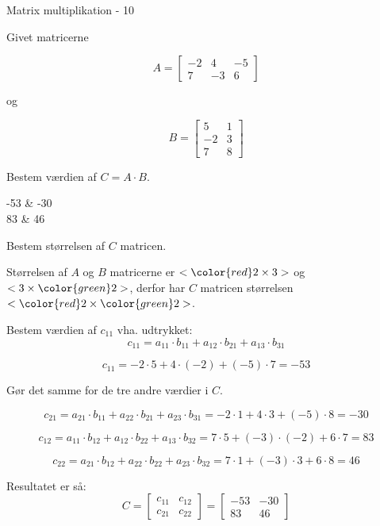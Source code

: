 \documentclass{article}
\begin{document}
\newpage

\begin{exercise}{Matrix multiplikation - 10}

Givet matricerne

\[
A = \left[\begin{array}{rrr}
-2 & 4 & -5 \\
7 & -3 & 6
\end{array} \right]
\]

og

\[
B = \left[\begin{array}{rr}
5 & 1 \\
-2 & 3 \\
7 & 8
\end{array} \right]
\]

Bestem værdien af $C = A \cdot B$.

\begin{answermatrix}
-53 & -30 \\
83 & 46
\end{answermatrix}

\hint
Bestem størrelsen af $C$ matricen.

\hint
Størrelsen af $A$ og $B$ matricerne er $<{\color{red} 2} \times 3>$ og $<3 \times {\color{green}2}>$,
derfor har $C$ matricen størrelsen $<{\color{red} 2} \times {\color{green}2}>$.

\hint
Bestem værdien af $c_{11}$ vha. udtrykket:
\[
c_{11} = a_{11} \cdot b_{11} + a_{12} \cdot b_{21} + a_{13} \cdot b_{31}
\]

\hint
\[
c_{11} = -2 \cdot 5 + 4 \cdot (-2) + (-5) \cdot 7 = -53
\]

\hint
Gør det samme for de tre andre værdier i $C$.

\hint
\[
c_{21} = a_{21} \cdot b_{11} + a_{22} \cdot b_{21} + a_{23} \cdot b_{31} = -2 \cdot 1 + 4 \cdot 3 + (-5) \cdot 8 = -30
\]

\hint
\[
c_{12} = a_{11} \cdot b_{12} + a_{12} \cdot b_{22} + a_{13} \cdot b_{32} = 7 \cdot 5 + (-3) \cdot (-2) + 6 \cdot 7 = 83
\]

\hint
\[
c_{22} = a_{21} \cdot b_{12} + a_{22} \cdot b_{22} + a_{23} \cdot b_{32} = 7 \cdot 1 + (-3) \cdot 3 + 6 \cdot 8 = 46
\]


\hint
Resultatet er så:
\[
C = \left[\begin{array}{rr}
c_{11} & c_{12} \\
c_{21} & c_{22}
\end{array} \right] =
\left[\begin{array}{rr}
-53 & -30 \\
83 & 46
\end{array} \right]
\]


\end{exercise}


\newpage


\end{document}
